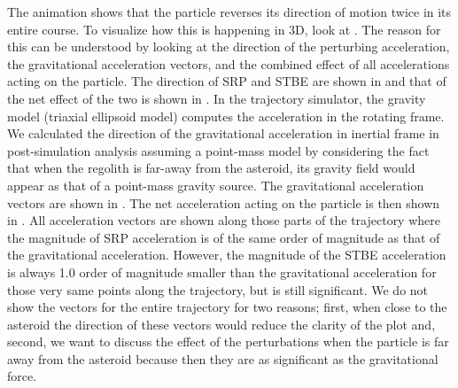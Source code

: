 %
\newline\newline
%
The animation shows that the particle reverses its direction of motion twice in its entire course. To visualize how this is happening in 3D, look at . The reason for this can be understood by looking at the direction of the perturbing acceleration, the gravitational acceleration vectors, and the combined effect of all accelerations acting on the particle. The direction of \gls{SRP} and \gls{STBE} are shown in  and that of the net effect of the two is shown in . In the trajectory simulator, the gravity model (triaxial ellipsoid model) computes the acceleration in the rotating frame. We calculated the direction of the gravitational acceleration in inertial frame in post-simulation analysis assuming a point-mass model by considering the fact that when the regolith is far-away from the asteroid, its gravity field would appear as that of a point-mass gravity source. The gravitational acceleration vectors are shown in . The net acceleration acting on the particle is then shown in . All acceleration vectors are shown along those parts of the trajectory where the magnitude of \gls{SRP} acceleration is of the same order of magnitude as that of the gravitational acceleration. However, the magnitude of the \gls{STBE} acceleration is always 1.0 order of magnitude smaller than the gravitational acceleration for those very same points along the trajectory, but is still significant. We do not show the vectors for the entire trajectory for two reasons; first, when close to the asteroid the direction of these vectors would reduce the clarity of the plot and,  second, we want to discuss the effect of the perturbations when the particle is far away from the asteroid because then they are as significant as the gravitational force.
%
\newline\newline
%
